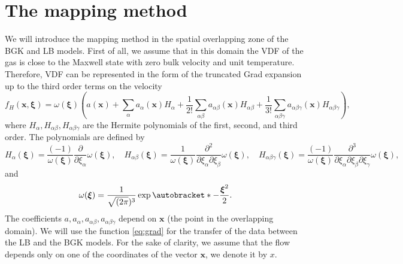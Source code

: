 \documentclass{elsarticle} %
\newcommand{\pder}[2][]{\frac{\partial#1}{\partial#2}}
\newcommand{\pderder}[3][]{\frac{\partial^2#1}{\partial#2\partial#3}}
\newcommand{\pderderder}[4][]{\frac{\partial^3#1}{\partial#2\partial#3\partial#4}}
\DeclarePairedDelimiter\autobracket()       %
\newcommand{\br}[1]{\autobracket*{#1}}
\newcommand{\bxi}{\boldsymbol{\xi}}
\newcommand{\bx}{\boldsymbol{x}}
\newcommand{\ai}{a_{\alpha}}
\newcommand{\aij}{a_{\alpha\beta}}
\newcommand{\aijk}{a_{\alpha\beta\gamma}}
\newcommand{\Hi}{H_{\alpha}}
\newcommand{\Hij}{H_{\alpha\beta}}
\newcommand{\Hijk}{H_{\alpha\beta\gamma}}
\begin{document}

\section{The mapping method}\label{sec:mapping}

We will introduce the mapping method in the spatial overlapping zone of the BGK and LB models.
First of all, we assume that in this domain the VDF of the gas is close to the Maxwell state with zero bulk velocity and unit temperature.
Therefore, VDF can be represented in the form of the truncated Grad expansion up to the third order terms on the velocity
\begin{equation}\label{eq:grad}
    f_H(\bx,\bxi) = \omega(\bxi)\left(
        a(\bx) + \sum_{\alpha}\ai(\bx)\Hi +
        \frac{1}{2!}\sum_{\alpha\beta}\aij(\bx)\Hij +
        \frac{1}{3!}\sum_{\alpha\beta \gamma}\aijk(\bx)\Hijk
    \right),
\end{equation}
where $\Hi, \Hij, \Hijk$ are the Hermite polynomials of the first, second, and third order.
The polynomials are defined by
\begin{equation}
    H_\alpha(\bxi) = \frac{(-1)}{\omega(\bxi)}\pder{\xi_\alpha}\omega(\bxi), \quad
    \Hij(\bxi) = \frac{1}{\omega(\bxi)}\pderder{\xi_\alpha}{\xi_\beta}\omega(\bxi), \quad
    \Hijk(\bxi) = \frac{(-1)}{\omega(\bxi)}\pderderder{\xi_\alpha}{\xi_\beta}{\xi_\gamma}\omega(\bxi),
\end{equation}
and
\begin{equation}
    \omega(\bxi) = \frac{1}{\sqrt{(2\pi})^3}\exp\br{ -\frac{\bxi^2}{2} }.
\end{equation}
The coefficients $a, \ai,\aij, \aijk$ depend on $\bx$ (the point in the overlapping domain).
We will use the function \eqref{eq:grad} for the transfer of the data between the LB and the BGK models.
For the sake of clarity, we assume that the flow depends only on one of the coordinates of the vector $\bx$,
we denote it by $x$.
\end{document}
